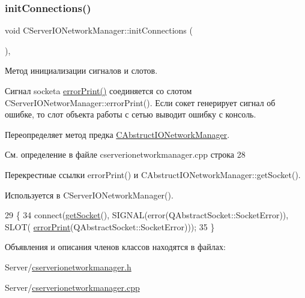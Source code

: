 \subsubsection{\texorpdfstring{init\+Connections()}{initConnections()}}
{\footnotesize\ttfamily void C\+Server\+I\+O\+Network\+Manager\+::init\+Connections (\begin{DoxyParamCaption}{ }\end{DoxyParamCaption})\hspace{0.3cm}{\ttfamily [protected]}, {\ttfamily [virtual]}}



Метод инициализации сигналов и слотов. 

Сигнал socket\textquotesingle{}a \hyperlink{class_c_server_i_o_network_manager_a27831f1d8f66c1e0d665c2ef52d262e4}{error\+Print()} соединяется со слотом C\+Server\+I\+O\+Networ\+Manager\+::error\+Print(). Если сокет генерирует сигнал об ошибке, то слот объекта работы с сетью выводит ошибку с консоль.

Переопределяет метод предка \hyperlink{class_c_abstruct_i_o_network_manager_ac01bfefacfa37050c8d3a9317a38fbf5}{C\+Abstruct\+I\+O\+Network\+Manager}.



См. определение в файле cserverionetworkmanager.\+cpp строка 28



Перекрестные ссылки error\+Print() и C\+Abstruct\+I\+O\+Network\+Manager\+::get\+Socket().



Используется в C\+Server\+I\+O\+Network\+Manager().


\begin{DoxyCode}
29 \{
34     connect(\hyperlink{class_c_abstruct_i_o_network_manager_a118a2c8254c149614cba51c42147c709}{getSocket}(), SIGNAL(error(QAbstractSocket::SocketError)), SLOT(
      \hyperlink{class_c_server_i_o_network_manager_a27831f1d8f66c1e0d665c2ef52d262e4}{errorPrint}(QAbstractSocket::SocketError)));
35 \}
\end{DoxyCode}


Объявления и описания членов классов находятся в файлах\+:\begin{DoxyCompactItemize}
\item 
Server/\hyperlink{cserverionetworkmanager_8h}{cserverionetworkmanager.\+h}\item 
Server/\hyperlink{cserverionetworkmanager_8cpp}{cserverionetworkmanager.\+cpp}\end{DoxyCompactItemize}

